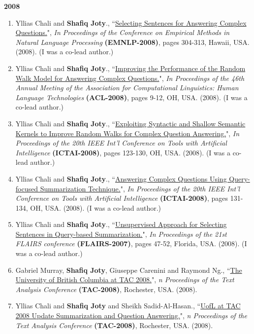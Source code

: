 \documentclass[paper=letter,fontsize=11pt]{scrartcl} %
\newcommand{\PaperEntry}[7]{
		\noindent #1, ``\href{#7}{#2}", \textit{#3} \textbf{#4}, #5 (#6).}
\begin{document}
\Large \textbf{2008} \normalsize
\begin{enumerate}

\item \PaperEntry{Yllias Chali and \textbf{Shafiq Joty}.}{Selecting Sentences for Answering Complex Questions.}{In Proceedings of the Conference on Empirical Methods in Natural Language Processing} {(EMNLP-2008)}{pages 304-313, Hawaii, USA.}{2008}
{http://www.aclweb.org/anthology/D08-1032}
(I was a co-lead author.)

\item \PaperEntry{Yllias Chali and \textbf{Shafiq Joty}.}{Improving the Performance of the Random Walk Model for Answering Complex Questions.}{In Proceedings of the 46th Annual Meeting of the Association for Computational Linguistics: Human Language Technologies} {(ACL-2008)}{pages 9-12, OH, USA.}{2008}
{http://dl.acm.org/citation.cfm?id=1557694}
(I was a co-lead author.)

\item \PaperEntry{Yllias Chali and \textbf{Shafiq Joty}.}{Exploiting Syntactic and Shallow Semantic Kernels to Improve Random Walks for Complex Question Answering.}{In Proceedings of the 20th IEEE Int'l Conference on Tools with Artificial Intelligence} {(ICTAI-2008)}{pages 123-130, OH, USA.}{2008}
{https://www.computer.org/csdl/proceedings/ictai/2008/3440/02/3440b123.pdf}
(I was a co-lead author.)

\item \PaperEntry{Yllias Chali and \textbf{Shafiq Joty}.}{Answering Complex Questions Using Query-focused Summarization Technique.}{In Proceedings of the 20th IEEE Int'l Conference on Tools with Artificial Intelligence} {(ICTAI-2008)}{pages 131-134, OH, USA.}{2008}
{https://www.computer.org/csdl/proceedings/ictai/2008/3440/02/3440b131.pdf}
(I was a co-lead author.)

\item \PaperEntry{Yllias Chali and \textbf{Shafiq Joty}.}{Unsupervised Approach for Selecting Sentences in Query-based Summarization.}{In Proceedings of the 21st FLAIRS conference} {(FLAIRS-2007)}{pages 47-52, Florida, USA.}{2008}
{http://www.aaai.org/Library/FLAIRS/2008/flairs08-019.php}
(I was a co-lead author.)

\item \PaperEntry{Gabriel Murray, \textbf{Shafiq Joty}, Giuseppe Carenini and Raymond Ng.}{The University of British Columbia at TAC 2008.}{n Proceedings of the Text Analysis Conference} {(TAC-2008)}{Rochester, USA.}{2008}
{http://www.nist.gov/tac/publications/2008/participant.papers/UBC.proceedings.pdf}

\item \PaperEntry{Yllias Chali and \textbf{Shafiq Joty} and Sheikh Sadid-Al-Hasan.}{UofL at TAC 2008 Update Summarization and Question Answering.}{n Proceedings of the Text Analysis Conference} {(TAC-2008)}{Rochester, USA.}{2008}
{http://www.nist.gov/tac/publications/2008/participant.papers/UofL.proceedings.pdf}

\end{enumerate}
\end{document}

